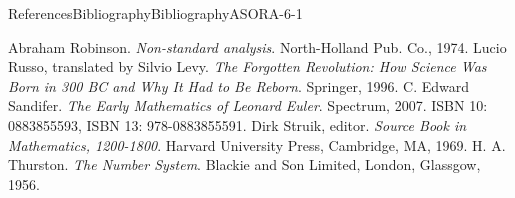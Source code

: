 \documentclass[oneside,10pt,]{book}
\newcommand{\xreffont}{\relax}
\numberwithin{equation}{part}
\begin{document}
\begin{references-chapter-numberless}{References}{Bibliography}{}{Bibliography}{}{}{ASORA-6-1}
\begin{referencelist}
\hypertarget{robinson74__non_stand_analy}{}Abraham Robinson. \emph{Non-standard analysis}. North-Holland Pub. Co., 1974.
\hypertarget{russo96__forgot_revol}{}Lucio Russo, translated by Silvio Levy. \emph{The Forgotten Revolution: How Science Was Born in 300 BC and Why It Had to Be Reborn}. Springer, 1996.
\hypertarget{sandifer07__early_mathem_leonar_euler}{}C. Edward Sandifer. \emph{The Early Mathematics of Leonard Euler}. Spectrum, 2007. ISBN 10: 0883855593, ISBN 13: 978-0883855591.
\hypertarget{struik69__sourc_book_mathem}{}Dirk Struik, editor. \emph{Source Book in Mathematics, 1200-1800}. Harvard University Press, Cambridge, MA, 1969.
\hypertarget{thurston56__number_system}{}H. A. Thurston. \emph{The Number System}. Blackie and Son Limited, London, Glassgow, 1956.
\end{referencelist}
\end{references-chapter-numberless}
%
{\xreffont\printindex}
%
\end{document}
